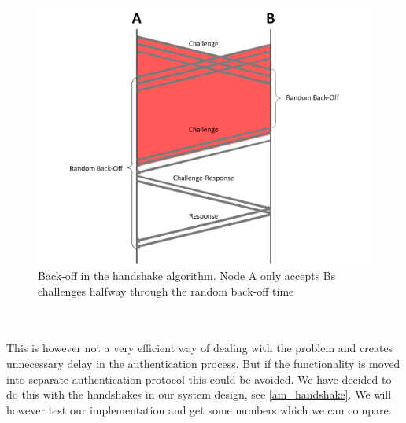 \begin{figure}[ht]
	\centering
		\includegraphics{images/4way_handshake_backoff.png}
	\caption{Back-off in the handshake algorithm. Node A only accepts Bs challenges halfway through the random back-off time}
	\label{fig:4way_handshake_backoff}
\end{figure}

\noindent
\\\\
This is however not a very efficient way of dealing with the problem and creates unnecessary delay in the authentication process. But if the functionality is moved into separate authentication protocol this could be avoided. We have decided to do this with the handshakes in our system design, see \ref{am_handshake}. We will however test our implementation and get some numbers which we can compare.



